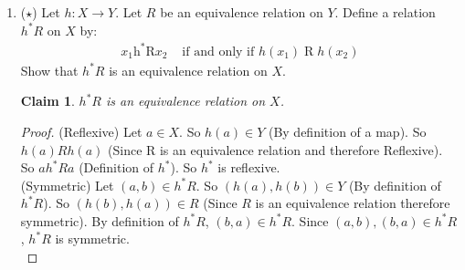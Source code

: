 \documentclass[11pt]{letter}
\newtheorem{claim}{Claim}
\theoremstyle{definition}
\begin{document}
\begin{enumerate}
\begin{proof}
          Case $x\in A$ and $x\notin B$: So $\chi_A=1$ and $\chi_B=0$ (According to the definition of $\chi$). So $(1-\chi_A(x))\chi_B(x)+(1-\chi_B)\chi_A=1$. Since $x\notin A\Delta B$ (x is in A but not in B, therefore according to the definition of $\Delta$, $x\in A\Delta B$). So $\chi_{A\Delta B}=1$. Therefore  $\chi_{A\Delta B}=(1-\chi_A)\chi_B+(1-\chi_B)\chi_A$. \\
          Case $x\notin A$ $x\in B$: So $\chi_A=0$ and $\chi_B=1$ (According to the definition of $\chi$). So $(1-\chi_A(x))\chi_B(x)+(1-\chi_B)\chi_A=1$. Since $x\in A\Delta B$ (x is not in A but in B, therefore according to the definition of $\Delta$, $x\in A\Delta B$). So $\chi_{A\Delta B}=1$. Therefore $\chi_{A\Delta B}=(1-\chi_A)\chi_B+(1-\chi_B)\chi_A$. \\
          Case $x\notin A$ and $x\notin B$: So $\chi_A=0$ and $\chi_B=0$ (According to the definition of $\chi$). So $(1-\chi_A(x))\chi_B(x)+(1-\chi_B)\chi_A=0$. Since $x\notin A\Delta B$ (x not in A or  B, therefore according to the definition of $\Delta$, $x\notin A\Delta B$). So $\chi_{A\Delta B}=0$. Therefore  $\chi_{A\Delta B}=(1-\chi_A)\chi_B+(1-\chi_B)\chi_A$. \\
          Since $\chi_{A\Delta B}=(1-\chi_A)\chi_B+(1-\chi_B)\chi_A$ for all conditions, $\chi_{A\Delta B}=(1-\chi_A)\chi_B+(1-\chi_B)\chi_A$.
        \end{proof}
			\item ($\star$) Let $h:X\rightarrow Y$. Let $R$ be an equivalence relation on $Y$. Define a relation $h^*R$ on $X$ by:
				\begin{align*}
					 x_1\operatorname{h^*R} x_2 &\text{ if and only if } h(x_1)\operatorname{R}h(x_2) 
				\end{align*}
				Show that $h^*R$ is an equivalence relation on $X$.
                                \begin{claim}
                                  $h^*R$ is an equivalence relation on $X$.
                                \end{claim}
                                \begin{proof}
                                  (Reflexive) Let $a\in X$. So $h(a)\in Y$ (By definition of a map). So $h(a)Rh(a)$ (Since R is an equivalence relation and therefore Reflexive). So $ah^*Ra$ (Definition of $h^*$). So $h^*$ is reflexive.\\
                                  (Symmetric) Let $(a,b)\in h^*R$. So $(h(a),h(b))\in Y$ (By definition of $h^*R$). So $(h(b),h(a))\in R$ (Since $R$ is an equivalence relation therefore symmetric). By definition of $h^*R$, $(b,a)\in h^*R$. Since $(a,b),(b,a)\in h^*R$, $h^*R$ is symmetric.\\

\end{proof}
\end{enumerate}
\end{document}
